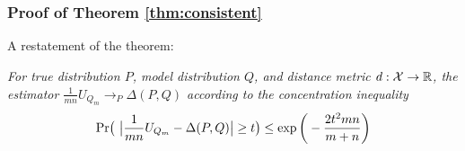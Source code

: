 \graphicspath{{./chapters/chapter2/}}
\chapter{ }
\subsection{Proof of Theorem \ref{thm:consistent}}
\label{sec:proof consistent}
A restatement of the theorem: 

\textit{
For true distribution $P$, model distribution $Q$, and distance metric $d:\mathcal{X} \rightarrow {\mathbb R}$, the estimator $\frac{1}{mn} U_{Q_m} \rightarrow_P \Delta(P,Q)$ according to the concentration inequality 
\begin{align*}
    {\mbox{\rm Pr}} \big( \ \big|\frac{1}{mn} U_{Q_m} - \Delta(P,Q) \big| \geq t\big) \leq 
    \exp \bigg( -\frac{2 t^2 mn}{m + n} \bigg)
\end{align*}
}
